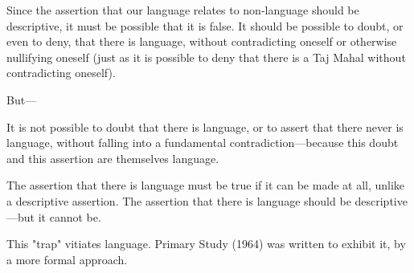 Since the assertion that our language relates to non-language should be descriptive, it must be possible that it is false. It should be possible to doubt, or even to deny, that there is language, without contradicting oneself or otherwise nullifying oneself (just as it is possible to deny that there is a Taj Mahal without contradicting oneself).

But---

It is not possible to doubt that there is language, or to assert that there never is language, without falling into a fundamental contradiction---because this doubt and this assertion are themselves language.

The assertion that there is language must be true if it can be made at all, unlike a descriptive assertion. The assertion that there is language should be descriptive---but it cannot be.

This "trap" vitiates language. Primary Study (1964) was written to exhibit it, by a more formal approach.
